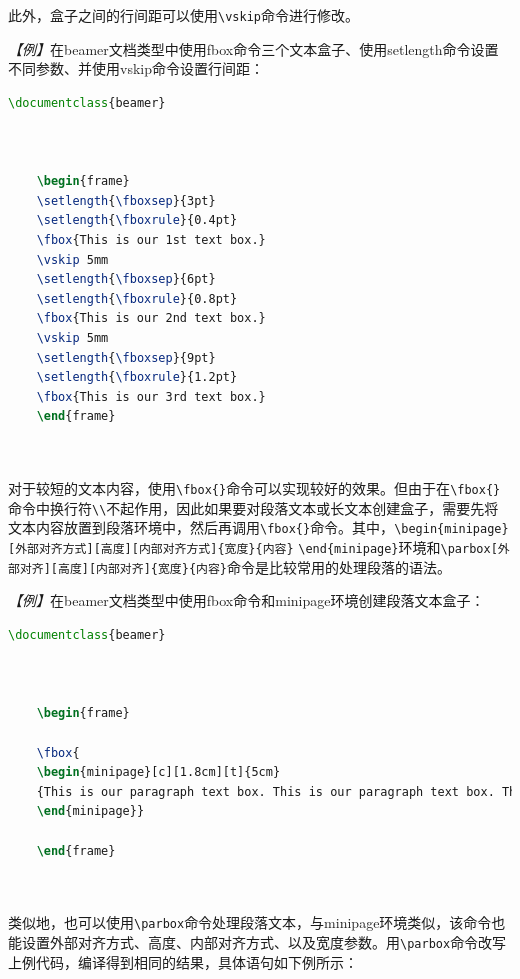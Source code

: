 此外，盒子之间的行间距可以使用\texttt{\textbackslash{}vskip}命令进行修改。

\emph{【例】}在beamer文档类型中使用fbox命令三个文本盒子、使用setlength命令设置不同参数、并使用vskip命令设置行间距：
\begin{lstlisting}[language=TeX]
    \documentclass{beamer}

    

    \begin{frame}
    \setlength{\fboxsep}{3pt}
    \setlength{\fboxrule}{0.4pt}
    \fbox{This is our 1st text box.}
    \vskip 5mm
    \setlength{\fboxsep}{6pt}
    \setlength{\fboxrule}{0.8pt}
    \fbox{This is our 2nd text box.}
    \vskip 5mm
    \setlength{\fboxsep}{9pt}
    \setlength{\fboxrule}{1.2pt}
    \fbox{This is our 3rd text box.}
    \end{frame}

    
\end{lstlisting}

对于较短的文本内容，使用\texttt{\textbackslash{}fbox\{\}}命令可以实现较好的效果。但由于在\texttt{\textbackslash{}fbox\{\}}命令中换行符\texttt{\textbackslash{}\textbackslash{}}不起作用，因此如果要对段落文本或长文本创建盒子，需要先将文本内容放置到段落环境中，然后再调用\texttt{\textbackslash{}fbox\{\}}命令。其中，\texttt{\textbackslash{}begin\{minipage\}[外部对齐方式][高度][内部对齐方式]\{宽度\}\{内容\}} \texttt{\textbackslash{}end\{minipage\}}环境和\texttt{\textbackslash{}parbox[外部对齐][高度][内部对齐]\{宽度\}\{内容\}}命令是比较常用的处理段落的语法。

\emph{【例】}在beamer文档类型中使用fbox命令和minipage环境创建段落文本盒子：
\begin{lstlisting}[language=TeX]
    \documentclass{beamer}

    

    \begin{frame}

    \fbox{
    \begin{minipage}[c][1.8cm][t]{5cm}
    {This is our paragraph text box. This is our paragraph text box. This is our paragraph text box. This is our paragraph text box.}
    \end{minipage}}

    \end{frame}

    
\end{lstlisting}

类似地，也可以使用\texttt{\textbackslash{}parbox}命令处理段落文本，与minipage环境类似，该命令也能设置外部对齐方式、高度、内部对齐方式、以及宽度参数。用\texttt{\textbackslash{}parbox}命令改写上例代码，编译得到相同的结果，具体语句如下例所示：

